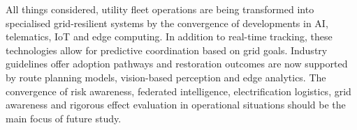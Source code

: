 All things considered, utility fleet operations are being transformed into specialised grid-resilient systems by the convergence of developments in AI, telematics, IoT and edge computing. In addition to real-time tracking, these technologies allow for predictive coordination based on grid goals. Industry guidelines offer adoption pathways and restoration outcomes are now supported by route planning models, vision-based perception and edge analytics. The convergence of risk awareness, federated intelligence, electrification logistics, grid awareness and rigorous effect evaluation in operational situations should be the main focus of future study.